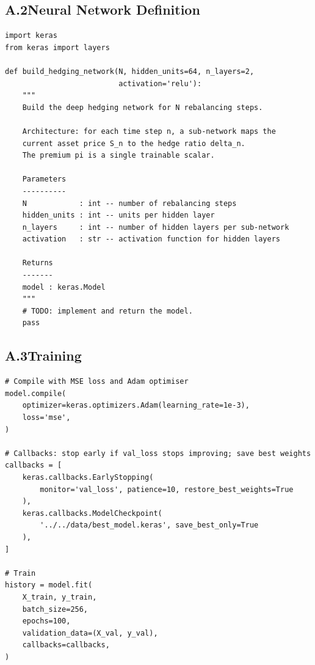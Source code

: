 \subsection*{A.2\quad Neural Network Definition}


\begin{lstlisting}[caption={Deep hedging network architecture.},
                   label={lst:model}]
import keras
from keras import layers

def build_hedging_network(N, hidden_units=64, n_layers=2,
                          activation='relu'):
    """
    Build the deep hedging network for N rebalancing steps.

    Architecture: for each time step n, a sub-network maps the
    current asset price S_n to the hedge ratio delta_n.
    The premium pi is a single trainable scalar.

    Parameters
    ----------
    N            : int -- number of rebalancing steps
    hidden_units : int -- units per hidden layer
    n_layers     : int -- number of hidden layers per sub-network
    activation   : str -- activation function for hidden layers

    Returns
    -------
    model : keras.Model
    """
    # TODO: implement and return the model.
    pass
\end{lstlisting}

\subsection*{A.3\quad Training}


\begin{lstlisting}[caption={Model compilation and training.},
                   label={lst:training}]
# Compile with MSE loss and Adam optimiser
model.compile(
    optimizer=keras.optimizers.Adam(learning_rate=1e-3),
    loss='mse',
)

# Callbacks: stop early if val_loss stops improving; save best weights
callbacks = [
    keras.callbacks.EarlyStopping(
        monitor='val_loss', patience=10, restore_best_weights=True
    ),
    keras.callbacks.ModelCheckpoint(
        '../../data/best_model.keras', save_best_only=True
    ),
]

# Train
history = model.fit(
    X_train, y_train,
    batch_size=256,
    epochs=100,
    validation_data=(X_val, y_val),
    callbacks=callbacks,
)
\end{lstlisting}
